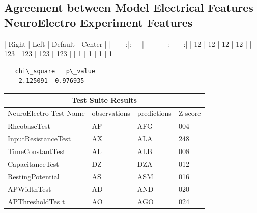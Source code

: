 
\subsection{Agreement between Model Electrical Features NeuroElectro Experiment Features}

\begin{markdown}
| Right | Left | Default | Center |
|------:|:-----|---------|:------:| 
|  12   |  12  |  12     |   12   | 
| 123   |  123 |   123   |  123   | 
|   1   |    1 |     1   |    1   | 
\end{markdown}




\begin{verbatim}
   chi\_square   p\_value
    2.125091  0.976935
\end{verbatim}


\setlength{\arrayrulewidth}{1mm}
\setlength{\tabcolsep}{18pt}
\renewcommand{\arraystretch}{2.5}

\begin{tabular}{ |p{3cm}||p{3cm}|p{3cm}|p{3cm}|  }
 \hline
 \multicolumn{4}{|c|}{Test Suite Results} \\
 \hline
 NeuroElectro Test Name & observations  & predictions & Z-score \\
 \hline
 RheobaseTest   & AF    &AFG&   004\\
 InputResistanceTest &   AX  & ALA   &248\\
 TimeConstantTest &AL & ALB&  008\\
 CapacitanceTest    &DZ & DZA&  012\\
 RestingPotential &   AS  & ASM&016\\
 APWidthTest & AD  & AND   &020\\
 APThresholdTes t& AO  & AGO&024\\
 \hline
\end{tabular}

